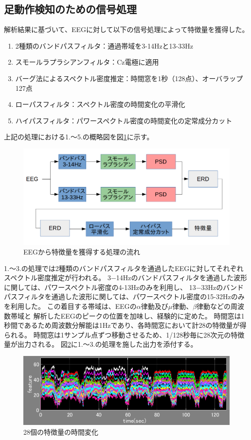 \subsection{\mc 足動作検知のための信号処理}
解析結果に基づいて、EEGに対して以下の信号処理によって特徴量を獲得した。
\begin{enumerate}
    \item 2種類のバンドパスフィルタ：通過帯域を3-14Hzと13-33Hz
    \item スモールラプラシアンフィルタ：Cz電極に適用
    \item バーグ法によるスペクトル密度推定：時間窓を1秒（128点）、オーバラップ127点
    \item ローパスフィルタ：スペクトル密度の時間変化の平滑化
    \item ハイパスフィルタ：パワースペクトル密度の時間変化の定常成分カット
\end{enumerate}
上記の処理における1.〜5.の概略図を図\ref{fig:footBCI}に示す。
\begin{figure}
    \centering
    \includegraphics[width=13cm]{images/prepro.png}
    \caption{EEGから特徴量を獲得する処理の流れ}
    \label{fig:footBCI}
\end{figure}
1.〜3.の処理では2種類のバンドパスフィルタを通過したEEGに対してそれぞれスペクトル密度推定が行われる。
3−14Hzのバンドパスフィルタを通過した波形に関しては、パワースペクトル密度の4-13Hzのみを利用し、
13−33Hzのバンドパスフィルタを通過した波形に関しては、パワースペクトル密度の15-32Hzのみを利用した。
この着目する帯域は、EEGの\(\alpha\)律動及び\(\mu\)律動、\(\beta\)律動などの周波数帯域と
解析したEEGのピークの位置を加味し、経験的に定めた。
時間窓は1秒間であるため周波数分解能は1Hzであり、各時間窓において計28の特徴量が得られる。
時間窓は1サンプル点ずつ移動させるため、1/128秒毎に28次元の特徴量が出力される。
図\ref{fig:nofilterERD}に1.〜3.の処理を施した出力を添付する。
\begin{figure}[p]
    \centering
    \includegraphics[width=13cm]{images/feature_sub1_nofilter.png}
    \caption{28個の特徴量の時間変化}
    \label{fig:nofilterERD}
\end{figure}
